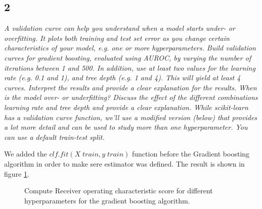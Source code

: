 \documentclass[a4paper,12pt]{article}
\begin{document}
{\subsection*{2}
{\it A validation curve can help you understand when a model starts under- or overfitting. It plots both training and test set error as you change certain characteristics of your model, e.g. one or more hyperparameters. Build validation curves for gradient boosting, evaluated using AUROC, by varying the number of iterations between 1 and 500. In addition, use at least two values for the learning rate (e.g. 0.1 and 1), and tree depth (e.g. 1 and 4). This will yield at least 4 curves. Interpret the results and provide a clear explanation for the results. When is the model over- or underfitting? Discuss the effect of the different combinations learning rate and tree depth and provide a clear explanation.
While scikit-learn has a validation curve function, we'll use a modified version (below) that provides a lot more detail and can be used to study more than one hyperparameter. You can use a default train-test split.}

\textnormal{We added the $clf.fit(X\; train,y\; train)$ function before the Gradient boosting algorithm in order to make sere estimator was defined. The result is shown in figure \ref{Q41a}.}
 
\begin{figure}[H]
\hfill
{}
\hfill
\caption{Compute Receiver operating characteristic score for different hyperparameters for the gradient boosting algorithm.}
\label{Q41a}
\end{figure}

}
\end{document}
